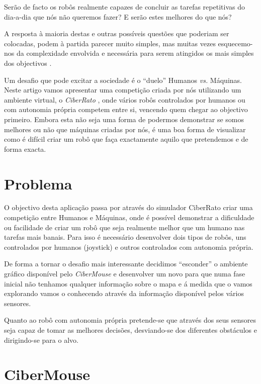 \documentclass[conference]{IEEEtran}
\begin{document}
Serão de facto os robôs realmente capazes de concluir as tarefas repetitivas do dia-a-dia que nós não queremos fazer? E serão estes melhores do que nós?

A resposta à maioria destas e outras possíveis questões que poderiam ser colocadas, podem à partida parecer muito simples, mas muitas vezes esquecemo-nos da complexidade envolvida e necessária para serem atingidos os mais simples dos objectivos \cite{IEEEhowto:h_vs_r}.

Um desafio que pode excitar a sociedade é o “duelo” Humanos \textit{vs.} Máquinas. Neste artigo vamos apresentar uma competição criada por nós utilizando um ambiente virtual, o \textit{CiberRato} \cite{IEEEhowto:rato_s}, onde vários robôs controlados por humanos ou com autonomia própria competem entre si, vencendo quem chegar ao objectivo primeiro. Embora esta não seja uma forma de podermos demonstrar se somos melhores ou não que máquinas criadas por nós, é uma boa forma de visualizar como é difícil criar um robô que faça exactamente aquilo que pretendemos e de forma exacta.

\section{Problema}

O objectivo desta aplicação passa por através do simulador CiberRato criar uma competição entre Humanos e Máquinas, onde é possível demonstrar a dificuldade ou facilidade de criar um robô que seja realmente melhor que um humano nas tarefas mais banais. Para isso é necessário desenvolver dois tipos de robôs, uns controlados por humanos (joystick) e outros controlados com autonomia própria.

De forma a tornar o desafio mais interessante decidimos “esconder” o ambiente gráfico disponível pelo \textit{CiberMouse} e desenvolver um novo para que numa fase inicial não tenhamos qualquer informação sobre o mapa e á medida que o vamos explorando vamos o conhecendo através da informação disponível pelos vários sensores.

Quanto ao robô com autonomia própria pretende-se que através dos seus sensores seja capaz de tomar as melhores decisões, desviando-se dos diferentes obstáculos e dirigindo-se para o alvo. 

\section{CiberMouse}
\end{document}
